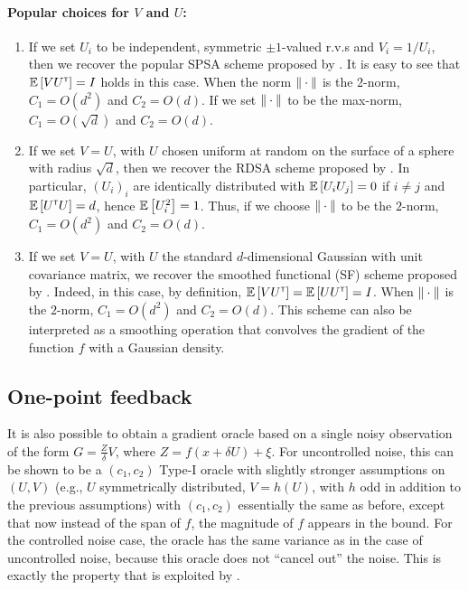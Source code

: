 \paragraph{Popular choices for $V$ and $U$:}
\begin{enumerate}[\bfseries (i)]
 \item If we set $U_i$ to be independent, symmetric $\pm 1$-valued r.v.s and $V_i = 1/U_i$, then we recover the popular SPSA scheme proposed by \cite{spall1992multivariate}.
It is easy to see that $\mathbb{E}\left[  V U^\mathsf{\scriptscriptstyle T} \right] = I$ holds in this case.
 When the norm $\|\cdot\|$ is the $2$-norm, $C_1 = O(d^2)$ and $C_2 = O(d)$. If we set $\|\cdot\|$ to be the max-norm, $C_1 = O(\sqrt{d})$ and $C_2 = O(d)$.
 \item If we set $V=U$, with $U$ chosen uniform at random on the surface of a sphere with radius $\sqrt{d}$,
 then we recover the RDSA scheme proposed by  \citeauthor{kushcla} \citep[cf. pp.~58--60][]{kushcla}.
 In particular, $(U_i)_i$ are identically distributed with $\mathbb{E}\left[ U_i U_j \right] = 0$ if $i\ne j$ and $\mathbb{E}\left[ U^\mathsf{\scriptscriptstyle T} U \right] = d$, hence $\mathbb{E}\left[U_i^2\right] = 1$. Thus, if we choose $\|\cdot\|$ to be the $2$-norm, $C_1 = O( d^2 )$ and $C_2 = O(d)$.
 \item If we set $V=U$, with $U$ the standard $d$-dimensional Gaussian with unit covariance matrix, we recover the smoothed functional (SF) scheme proposed by \cite{katkul}.
Indeed, in this case, by definition, $\mathbb{E}\left[VU^\mathsf{\scriptscriptstyle T}\right] = \mathbb{E}\left[U U^\mathsf{\scriptscriptstyle T} \right] = I$.
When $\|\cdot\|$ is the $2$-norm, $C_1 = O(d^2)$
 and $C_2 = O( d)$.
 This scheme can also be interpreted as a smoothing operation that  convolves the gradient of the function $f$ with a Gaussian density.
\end{enumerate}

\subsection{One-point feedback}
It is also possible to obtain a gradient oracle based on a single noisy observation
of the form $G = \frac{Z}{\delta}V$, where $Z = f(x+\delta U) + \xi$.
For uncontrolled noise, this can be shown to be a $(c_1,c_2)$ Type-I oracle with slightly stronger assumptions on $(U,V)$ (e.g., $U$ symmetrically distributed, $V = h(U)$, with $h$ odd in addition to the previous assumptions)
with $(c_1,c_2)$ essentially the same as before, except that now instead of the span of $f$, the magnitude of $f$ appears in the bound. For the controlled noise case, the oracle has the same variance as in the case of uncontrolled noise, because this oracle does not ``cancel out'' the noise.%
This is exactly the property that is exploited by \cite{duchi2015optimal}.

